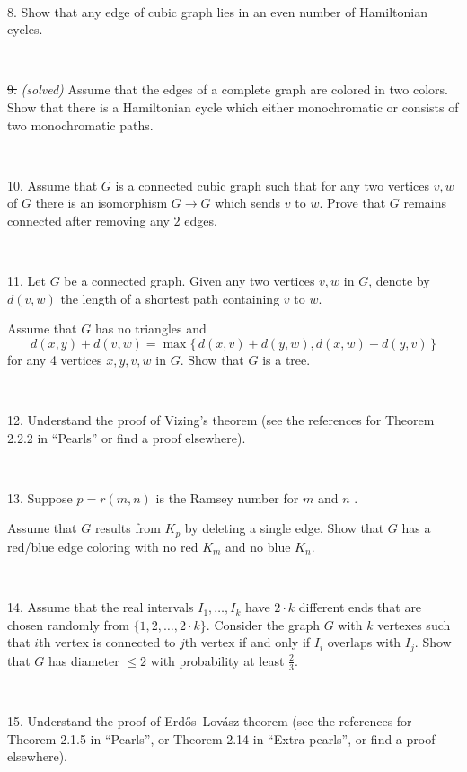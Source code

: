 \documentclass[oneside,a4paper]{article}
\begin{document}
\ 

\noindent %
{8.} %
Show that any edge of cubic graph lies in an even number of Hamiltonian cycles.


\ 

\noindent 
\sout{9.} \textit{(solved)}
Assume that the edges of a complete graph are colored in two colors.
Show that there is a Hamiltonian cycle which either monochromatic or consists of two monochromatic paths.

\ 

\noindent %
{10.}  %
Assume that $G$ is a connected cubic graph such that 
for any two vertices $v,w$ of $G$ there is an isomorphism
$G\to G$ which sends $v$ to $w$.
Prove that $G$ remains connected after removing any $2$ edges.

\ 


\noindent %
{11.} %
Let $G$ be a connected graph.
Given any two vertices $v,w$ in $G$, denote by $d(v,w)$ the length of a shortest path containing $v$ to $w$. 

Assume that $G$ has no triangles and
\[d(x,y)+d(v,w)=\max\{\,d(x,v)+d(y,w),d(x,w)+d(y,v)\,\}\]
for any 4 vertices $x,y,v,w$ in $G$.
Show that $G$ is a tree.

\ 

\noindent %
{12.} %
Understand the proof of Vizing's theorem (see the references for Theorem 2.2.2 in ``Pearls'' or find a proof elsewhere).

\ 

\noindent %
{13.} %
Suppose $p=r(m,n)$ is the Ramsey number for $m$ and $n$%
.

Assume that $G$ results from $K_p$ by deleting a single edge.
Show that $G$ has a red/blue edge coloring with no red
$K_m$ and no blue $K_n$.


\ 

\noindent %
{14.} %
Assume that the real intervals $I_1,\dots,I_k$ have $2{\cdot}k$ different ends that are chosen randomly from $\{1,2,\dots,2{\cdot} k\}$.
Consider the graph $G$ with $k$ vertexes such that $i$th vertex is connected to $j$th vertex if and only if $I_i$ overlaps with $I_j$.
Show that $G$ has diameter $\le 2$ with probability at least $\tfrac23$.

\ 

\noindent %
{15.} 
Understand the proof of Erd\H{o}s--Lov\'{a}sz theorem (see the references for Theorem 2.1.5 in ``Pearls'', or Theorem 2.14 in ``Extra pearls'', or find a proof elsewhere).
\end{document}
